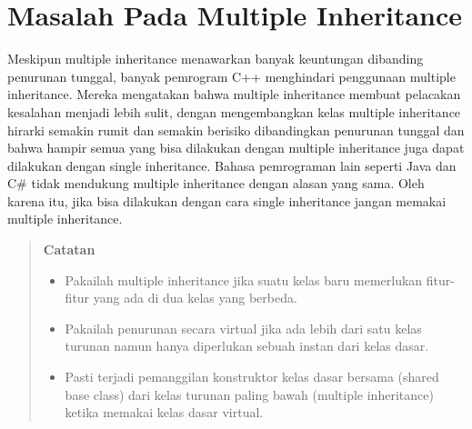 \section{Masalah Pada Multiple Inheritance}\label{masalah-pada-multiple-inheritance}

Meskipun multiple inheritance menawarkan banyak keuntungan dibanding
penurunan tunggal, banyak pemrogram C++ menghindari penggunaan multiple
inheritance. Mereka mengatakan bahwa multiple inheritance membuat
pelacakan kesalahan menjadi lebih sulit, dengan mengembangkan kelas
multiple inheritance hirarki semakin rumit dan semakin berisiko
dibandingkan penurunan tunggal dan bahwa hampir semua yang bisa
dilakukan dengan multiple inheritance juga dapat dilakukan dengan single
inheritance. Bahasa pemrograman lain seperti Java dan C\# tidak
mendukung multiple inheritance dengan alasan yang sama. Oleh karena itu,
jika bisa dilakukan dengan cara single inheritance jangan memakai
multiple inheritance.

\begin{quotation}
 {\LARGE {}} 	\textbf{Catatan}
	\begin{itemize}
		\item Pakailah multiple inheritance jika suatu kelas baru memerlukan
		fitur-fitur yang ada di dua kelas yang berbeda.
		\item Pakailah penurunan secara virtual jika ada lebih dari satu kelas turunan
		namun hanya diperlukan sebuah instan dari kelas dasar.
		\item Pasti terjadi pemanggilan konstruktor kelas dasar bersama (shared base
		class) dari kelas turunan paling bawah (multiple inheritance) ketika
		memakai kelas dasar virtual.
	\end{itemize}
\end{quotation}
 

